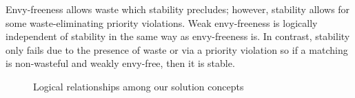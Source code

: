 Envy-freeness allows waste which stability precludes; however, stability allows for some waste-eliminating priority violations. Weak envy-freeness is logically independent of stability in the same way as envy-freeness is. In contrast, stability only fails due to the presence of waste or via a priority violation  so if a matching is non-wasteful and weakly envy-free, then it is stable.
\begin{figure}[!htb]
    \def\svgwidth{\columnwidth}
    
    \caption{Logical relationships among our solution concepts}
    \label{fig:matching}
\end{figure}

